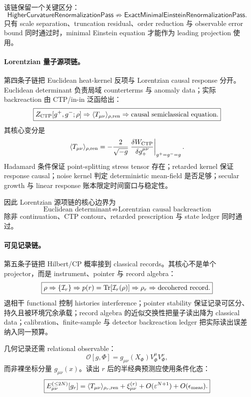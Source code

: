 该链保留一个关键区分：
\[
\boxed{
\mathsf{HigherCurvatureRenormalizationPass}
\not\Rightarrow
\mathsf{ExactMinimalEinsteinRenormalizationPass}.
}
\]
只有 scale separation、truncation residual、order reduction 与 observable error bound 同时通过时，minimal Einstein equation 才能作为 leading projection 使用。

\paragraph{Lorentzian 量子源项链。}
第四条子链把 Euclidean heat-kernel 反项与 Lorentzian causal response 分开。Euclidean determinant 负责局域 counterterms 与 anomaly data；实际 backreaction 由 CTP/in-in 泛函给出：
\[
\boxed{
Z_{\rm CTP}[g^+,g^-;\rho]
\Rightarrow
\langle T_{\mu\nu}\rangle_{\rho,{\rm ren}}
\Rightarrow
\text{causal semiclassical equation}.
}
\]
其核心变分是
\[
\langle T_{\mu\nu}\rangle_{\rho,{\rm ren}}
=
-\frac{2}{\sqrt{-g}}
\left.
\frac{\delta W_{\rm CTP}}
{\delta g_+^{\mu\nu}}
\right|_{g^+=g^-=g}.
\]
Hadamard 条件保证 point-splitting stress tensor 存在；retarded kernel 保证 response causal；noise kernel 判定 deterministic mean-field 是否足够；secular growth 与 linear response 账本限定时间窗口与稳定性。

因此 Lorentzian 源项链的核心边界为
\[
\boxed{
\text{Euclidean determinant}
\not\Rightarrow
\text{Lorentzian causal backreaction}
}
\]
除非 continuation、CTP contour、retarded prescription 与 state ledger 同时通过。

\paragraph{可见记录链。}
第五条子链把 Hilbert/CP 概率接到 classical records。其核心不是单个 projector，而是 instrument、pointer 与 record algebra：
\[
\boxed{
\rho
\Rightarrow
\{\mathcal I_r\}
\Rightarrow
p(r)={\rm Tr}[\mathcal I_r(\rho)]
\Rightarrow
\rho_r
\Rightarrow
\text{decohered record}.
}
\]
退相干 functional 控制 histories interference；pointer stability 保证记录可区分、持久且被环境冗余承载；record algebra 的近似交换性把量子读出降为 classical data；calibration、finite-sample 与 detector backreaction ledger 把实际读出误差纳入同一预算。

几何记录还需 relational observable：
\[
\mathcal O[g,\Phi]
=
g_{\mu\nu}(X_\Phi)V^\mu_\Phi V^\nu_\Phi,
\]
而非裸坐标分量 \(g_{\mu\nu}(x)\)。读出 \(r\) 后的半经典预测应使用条件化态：
\[
\boxed{
E_{\mu\nu}^{(\le2N)}[g_r]
=
\langle T_{\mu\nu}\rangle_{\rho_r,{\rm ren}}
+\xi_{\mu\nu}^{(r)}
+O(\varepsilon^{N+1})
+O(\epsilon_{\rm meas}).
}
\]

